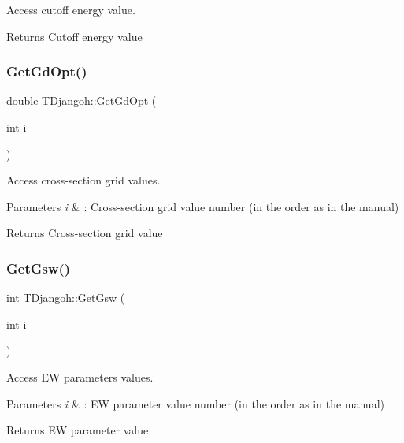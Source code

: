 Access cutoff energy value. 

\begin{DoxyReturn}{Returns}
Cutoff energy value 
\end{DoxyReturn}
\mbox{\label{class_t_djangoh_a74a77949c408cc303ec5e90482b1e639}} 
\subsubsection{\texorpdfstring{Get\+Gd\+Opt()}{GetGdOpt()}}
{\footnotesize\ttfamily double T\+Djangoh\+::\+Get\+Gd\+Opt (\begin{DoxyParamCaption}\item[{int}]{i }\end{DoxyParamCaption})}



Access cross-\/section grid values. 


\begin{DoxyParams}{Parameters}
{\em i} & \+: Cross-\/section grid value number (in the order as in the manual) \\
\hline
\end{DoxyParams}
\begin{DoxyReturn}{Returns}
Cross-\/section grid value 
\end{DoxyReturn}
\mbox{\label{class_t_djangoh_ac58587b988731552d41321364c30748d}} 
\subsubsection{\texorpdfstring{Get\+Gsw()}{GetGsw()}}
{\footnotesize\ttfamily int T\+Djangoh\+::\+Get\+Gsw (\begin{DoxyParamCaption}\item[{int}]{i }\end{DoxyParamCaption})}



Access EW parameters values. 


\begin{DoxyParams}{Parameters}
{\em i} & \+: EW parameter value number (in the order as in the manual) \\
\hline
\end{DoxyParams}
\begin{DoxyReturn}{Returns}
EW parameter value 
\end{DoxyReturn}
\mbox{\label{class_t_djangoh_aaa275337568bcd47d87a63f1de688d27}} 
